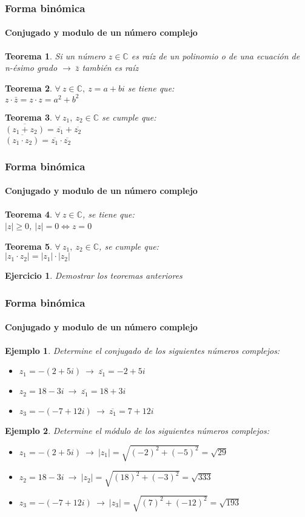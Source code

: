 \documentclass[11pt]{beamer}
\newtheorem{eje}{Ejercicio}
\newtheorem{ejem}{Ejemplo}
\newtheorem{teor}{Teorema}
\begin{document}
\begin{frame}
\frametitle{Forma binómica}
\framesubtitle{Conjugado y modulo de un número complejo}
\begin{teor}
Si un número $z\in \mathbb{C}$ es raíz de un polinomio o de una ecuación de n-ésimo grado $\rightarrow~\bar{z}$ también es raíz
\end{teor}
\begin{teor}
$\forall~z\in \mathbb{C},~z=a+bi$ se tiene que:\\
$z\cdot \bar{z} = z\cdot z = a^2+b^2$
\end{teor}
\begin{teor}
$\forall~z_1,~z_2\in \mathbb{C}$ se cumple que:\\
$\overline{(z_1+z_2)} = \overline{z_1}+\overline{z_2}$\\
$\overline{(z_1 \cdot z_2)} = \overline{z_1}\cdot \overline{z_2}$
\end{teor}
\end{frame}

\begin{frame}
\frametitle{Forma binómica}
\framesubtitle{Conjugado y modulo de un número complejo}
\begin{teor}
$\forall~z\in \mathbb{C}$, se tiene que: \\
$|z| \geq 0$, $|z| = 0 \Longleftrightarrow z = 0$
\end{teor}
\begin{teor}
$\forall~z_1,~z_2\in \mathbb{C}$, se cumple que: \\
$|z_1 \cdot z_2| = |z_1|\cdot |z_2|$
\end{teor}
\begin{eje}
Demostrar los teoremas anteriores
\end{eje}
\end{frame}

\begin{frame}
\frametitle{Forma binómica}
\framesubtitle{Conjugado y modulo de un número complejo}
\begin{ejem}
Determine el conjugado de los siguientes números complejos:\\
\begin{itemize}
\item $z_1 = -(2+5i)~\rightarrow~\overline{z_1} = -2+5i$
\item $z_2 = 18-3i~\rightarrow~\overline{z_1} = 18+3i$
\item $z_3 = -(-7+12i)~\rightarrow~\overline{z_1} = 7+12i$
\end{itemize}
\end{ejem}
\begin{ejem}
Determine el módulo de los siguientes números complejos:\\
\begin{itemize}
\item $z_1 = -(2+5i)~\rightarrow~|z_1| = \sqrt{(-2)^2+(-5)^2} = \sqrt{29}$
\item $z_2 = 18-3i~\rightarrow~|z_2| = \sqrt{(18)^2+(-3)^2} = \sqrt{333}$
\item $z_3 = -(-7+12i)~\rightarrow~|z_3| = \sqrt{(7)^2+(-12)^2} = \sqrt{193}$
\end{itemize}
\end{ejem}
\end{frame}
\end{document}
